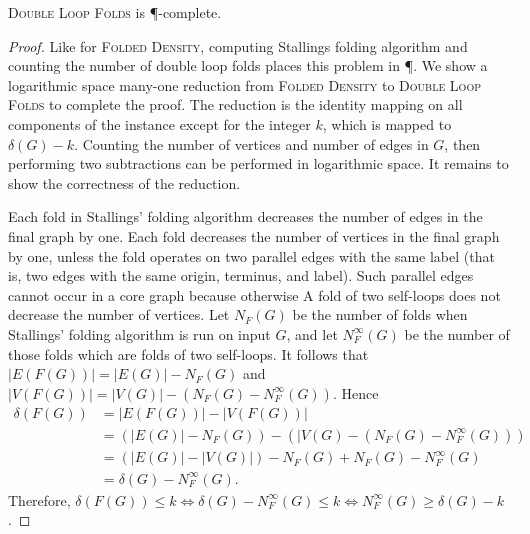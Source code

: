 \documentclass{article}
\newcommand{\FD}{\textsc{Folded Density}}
\newcommand{\DLF}{\textsc{Double Loop Folds}}
\begin{document}
\begin{theorem}
  \DLF{} is \P-complete.
\end{theorem}
\begin{proof}
  Like for \FD, computing Stallings folding algorithm and counting the number of double loop folds places this problem in \P.
  We show a logarithmic space many-one reduction from \FD{} to \DLF{} to complete the proof.
  The reduction is the identity mapping on all components of the instance except for the integer $k$, which is mapped to $\delta(G) - k$.
  Counting the number of vertices and number of edges in $G$, then performing two subtractions can be performed in logarithmic space.
  It remains to show the correctness of the reduction.

  Each fold in Stallings' folding algorithm decreases the number of edges in the final graph by one.
  Each fold decreases the number of vertices in the final graph by one, unless the fold operates on two parallel edges with the same label (that is, two edges with the same origin, terminus, and label).
  Such parallel edges cannot occur in a core graph because otherwise
  A fold of two self-loops does not decrease the number of vertices.
  Let $N_F(G)$ be the number of folds when Stallings' folding algorithm is run on input $G$, and let $N^\infty_F(G)$ be the number of those folds which are folds of two self-loops.
  It follows that $|E(F(G))| = |E(G)| - N_F(G)$ and $|V(F(G))| = |V(G)| - (N_F(G) - N^\infty_F(G))$.
  Hence
  \begin{align*}
    \delta(F(G)) & = |E(F(G))| - |V(F(G))| \\
                 & = (|E(G)| - N_F(G)) - (|V(G) - (N_F(G) - N^\infty_F(G))) \\
                 & = (|E(G)| - |V(G)|) - N_F(G) + N_F(G) - N^\infty_F(G) \\
                 & = \delta(G) - N^\infty_F(G).
  \end{align*}
  Therefore, $\delta(F(G)) \leq k \iff \delta(G) - N^\infty_F(G) \leq k \iff N^\infty_F(G) \geq \delta(G) - k$.
\end{proof}



\end{document}
